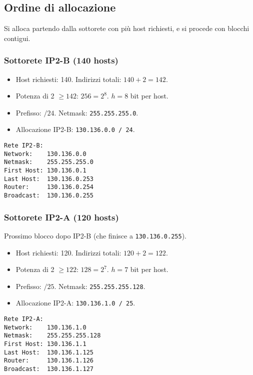 \subsection{Ordine di allocazione}
Si alloca partendo dalla sottorete con più host richiesti, e si procede con blocchi contigui.

\subsubsection{Sottorete IP2-B (140 hosts)}
\begin{itemize}
    \item Host richiesti: 140. Indirizzi totali: $140 + 2 = 142$.
    \item Potenza di 2 $\geq 142$: $256 = 2^8$. $h=8$ bit per host.
    \item Prefisso: $/24$. Netmask: \texttt{255.255.255.0}.
    \item Allocazione IP2-B: \texttt{130.136.0.0 / 24}.
\end{itemize}
\begin{verbatim}
Rete IP2-B:
Network:    130.136.0.0
Netmask:    255.255.255.0
First Host: 130.136.0.1
Last Host:  130.136.0.253
Router:     130.136.0.254
Broadcast:  130.136.0.255
\end{verbatim}

\subsubsection{Sottorete IP2-A (120 hosts)}
Prossimo blocco dopo IP2-B (che finisce a \texttt{130.136.0.255}).
\begin{itemize}
    \item Host richiesti: 120. Indirizzi totali: $120 + 2 = 122$.
    \item Potenza di 2 $\geq 122$: $128 = 2^7$. $h=7$ bit per host.
    \item Prefisso: $/25$. Netmask: \texttt{255.255.255.128}.
    \item Allocazione IP2-A: \texttt{130.136.1.0 / 25}.
\end{itemize}
\begin{verbatim}
Rete IP2-A:
Network:    130.136.1.0
Netmask:    255.255.255.128
First Host: 130.136.1.1
Last Host:  130.136.1.125
Router:     130.136.1.126
Broadcast:  130.136.1.127
\end{verbatim}

